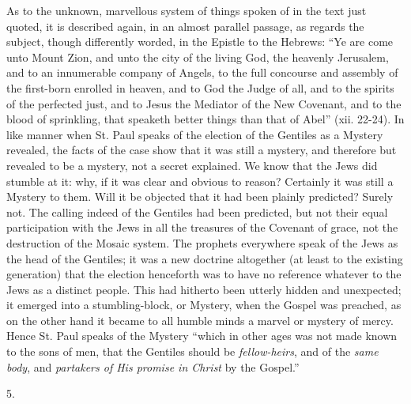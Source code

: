 As to the unknown, marvellous system of things
spoken of in the text just quoted, it is described again, in an almost
parallel passage, as regards the subject, though differently worded,
in the Epistle to the Hebrews: ``Ye are come unto Mount Zion, and
unto the city of the living God, the heavenly Jerusalem, and to an
innumerable company of Angels, to the full concourse and assembly of
the first-born enrolled in heaven, and to God the Judge of all, and to
the spirits of the perfected just, and to Jesus the Mediator of the
New Covenant, and to the blood of sprinkling, that speaketh better
things than that of Abel'' (xii. 22-24). In like manner when St. Paul
speaks of the election of the Gentiles as a Mystery revealed, the
facts of the case show that it was still a mystery, and therefore but
revealed to be a mystery, not a secret explained. We know that the
Jews did stumble at it: why, if it was clear and obvious to reason?
Certainly it was still a Mystery to them. Will it be objected that it
had been plainly predicted? Surely not. The calling indeed of the
Gentiles had been predicted, but not their equal participation with
the Jews in all the treasures of the Covenant of grace, not the
destruction of the Mosaic system. The prophets everywhere speak of the
Jews as the head of the Gentiles; it was a new doctrine altogether (at
least to the existing generation) that the election henceforth was to
have no reference whatever to the Jews as a distinct people. This had
hitherto been utterly hidden and unexpected; it emerged into a
stumbling-block, or Mystery, when the Gospel was preached, as on
the other hand it became to all humble minds a marvel or mystery of
mercy. Hence St. Paul speaks of the Mystery ``which in other ages was
not made known to the sons of men, that the Gentiles should be \emph{fellow-heirs},
and of the \emph{same body}, and \emph{partakers of His promise in Christ}
by the Gospel.''

5.

